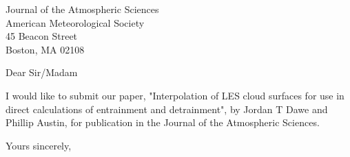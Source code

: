 \documentclass[12pt]{UBCletter}
\date{\today}
\begin{document}
\begin{letter}{%
Journal of the Atmospheric Sciences\\
American Meteorological Society\\
45 Beacon Street\\
Boston, MA 02108}

\opening{Dear Sir/Madam}

I would like to submit our paper, "Interpolation of LES 
cloud surfaces for use in direct calculations of 
entrainment and detrainment", by Jordan T Dawe and Phillip 
Austin, for publication in the Journal of the Atmospheric
Sciences.

\closing{Yours sincerely,}
\end{letter}
\end{document}
